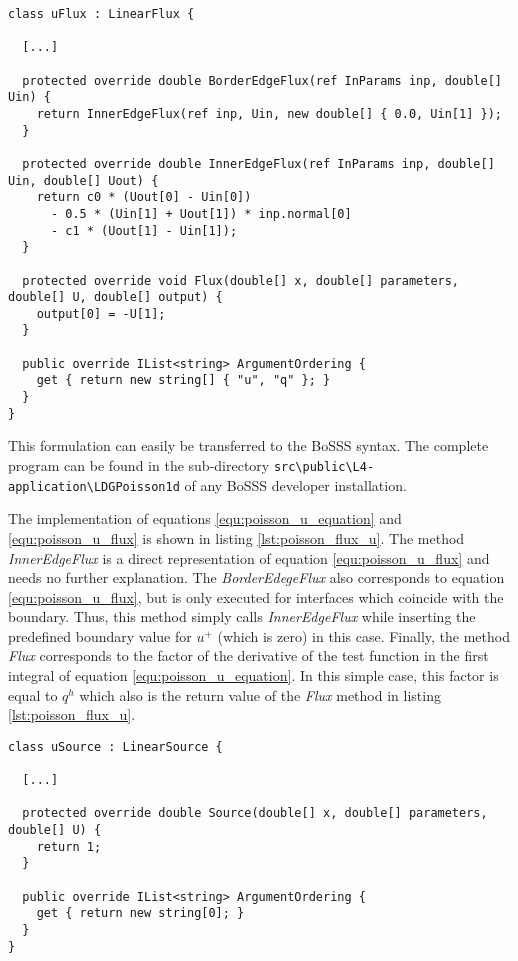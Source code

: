 \begin{lstlisting}[caption=BoSSS implementation of the left hand side of 
equation \ref{equ:poisson_u_equation} and of equation 
\ref{equ:poisson_u_flux}, label=lst:poisson_flux_u]
class uFlux : LinearFlux {
    
  [...]
    
  protected override double BorderEdgeFlux(ref InParams inp, double[] Uin) {
    return InnerEdgeFlux(ref inp, Uin, new double[] { 0.0, Uin[1] });
  }
      
  protected override double InnerEdgeFlux(ref InParams inp, double[] Uin, double[] Uout) {
    return c0 * (Uout[0] - Uin[0])
      - 0.5 * (Uin[1] + Uout[1]) * inp.normal[0]
      - c1 * (Uout[1] - Uin[1]);
  }

  protected override void Flux(double[] x, double[] parameters, double[] U, double[] output) {
    output[0] = -U[1];
  }
  
  public override IList<string> ArgumentOrdering {
    get { return new string[] { "u", "q" }; }
  }
}
\end{lstlisting}

This formulation can easily be transferred to the BoSSS syntax. The complete
program can be found in the sub-directory
\verb|src\public\L4-application\LDGPoisson1d| of any BoSSS developer
installation.

The implementation of equations \ref{equ:poisson_u_equation} and 
\ref{equ:poisson_u_flux} is shown in listing \ref{lst:poisson_flux_u}. The 
method \emph{InnerEdgeFlux} is a direct representation of equation
\ref{equ:poisson_u_flux} and needs no further explanation. The
\emph{BorderEdegeFlux} also corresponds to equation \ref{equ:poisson_u_flux},
but is only executed for interfaces which coincide with the boundary. Thus,
this method simply calls \emph{InnerEdgeFlux} while inserting the predefined
boundary value for $u^+$ (which is zero) in this case. Finally, the method
\emph{Flux} corresponds to the factor of the derivative of the test function
in the first integral of equation \ref{equ:poisson_u_equation}. In this simple
case, this factor is equal to $q^h$ which also is the return value of the
\emph{Flux} method in listing \ref{lst:poisson_flux_u}.

\begin{lstlisting}[caption=BoSSS implementation of the right hand side of
equation \ref{equ:poisson_u_equation},label=lst:poisson_source_u]
class uSource : LinearSource {
  
  [...]
  
  protected override double Source(double[] x, double[] parameters, double[] U) {
    return 1;
  }
  
  public override IList<string> ArgumentOrdering {
    get { return new string[0]; }
  }
}
\end{lstlisting}

